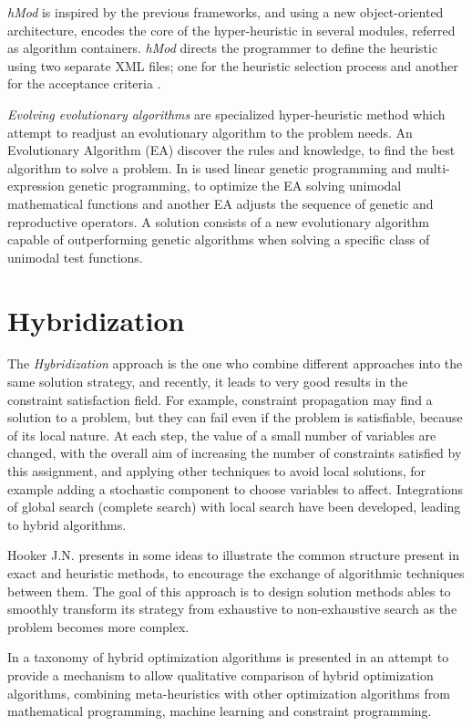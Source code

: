 \textit{hMod} is inspired by the previous frameworks, and using a new object-oriented architecture, encodes the core of the hyper-heuristic in several modules, referred as algorithm containers. \textit{hMod} directs the programmer to define the heuristic using two separate XML files; one for the heuristic selection process and another for the acceptance criteria \cite{Urra2013}.

\textit{Evolving evolutionary algorithms} are specialized hyper-heuristic method which attempt to readjust an evolutionary algorithm to the problem needs. An Evolutionary Algorithm (EA) discover the rules and knowledge, to find the best algorithm to solve a problem. In \cite{Diosan2009} is used linear genetic programming and multi-expression genetic programming, to optimize the EA solving unimodal mathematical functions and another EA adjusts the sequence of genetic and reproductive operators. A solution consists of a new evolutionary algorithm capable of outperforming genetic algorithms when solving a specific class of unimodal test functions. 

\section{Hybridization}
\label{sec:hybrid}

The \textit{Hybridization} approach is the one who combine different approaches into the same solution strategy, and recently, it leads to very good results in the constraint satisfaction field. For example, constraint propagation may find a solution to a problem, but they can fail even if the problem is satisfiable, because of its local nature. At each step, the value of a small number of variables are changed, with the overall aim of increasing the number of constraints satisfied by this assignment, and applying other techniques to avoid local solutions, for example adding a stochastic component to choose variables to affect. Integrations of global search (complete search) with local search have been developed, leading to hybrid algorithms. 

Hooker J.N. presents in \cite{Hooker2012} some ideas to illustrate the common structure present in exact and heuristic methods, to encourage the exchange of algorithmic techniques between them. The goal of this approach is to design solution methods ables to smoothly transform its strategy from exhaustive to non-exhaustive search as the problem becomes more complex.

In \cite{El-Ghazali2013} a taxonomy of hybrid optimization algorithms is presented in an attempt to provide a mechanism to allow qualitative comparison of hybrid optimization algorithms, combining meta-heuristics with other optimization algorithms from mathematical programming, machine learning and constraint programming.

